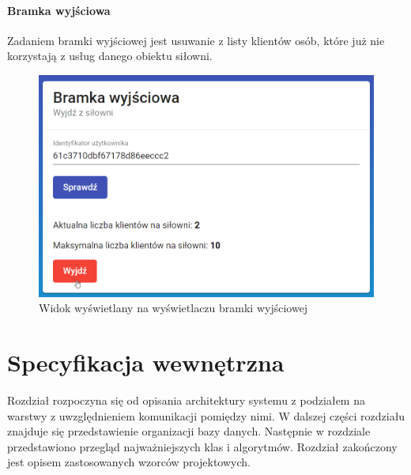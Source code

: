 \documentclass[a4paper,twoside,12pt]{book}
\begin{document}
{\subsubsection{Bramka wyjściowa}
Zadaniem bramki wyjściowej jest usuwanie z listy klientów osób, które już nie korzystają z usług danego obiektu siłowni.
\begin{figure}[h!]
	\centering
	\includegraphics[width=1\linewidth]{../zrzuty_ekranu/dzialanie/bramki/bramka_wyjsciowa}
	\caption{Widok wyświetlany na wyświetlaczu bramki wyjściowej}
	\label{fig:bramkawyjsciowa}
\end{figure}
\FloatBarrier

\chapter{Specyfikacja wewnętrzna}
\label{chap:internal}
Rozdział rozpoczyna się od opisania architektury systemu z podziałem na warstwy z uwzględnieniem komunikacji pomiędzy nimi. W dalszej części rozdziału znajduje się przedstawienie organizacji bazy danych. Następnie w rozdziale przedstawiono przegląd najważniejszych klas i algorytmów. Rozdział zakończony jest opisem zastosowanych wzorców projektowych.

}
\end{document}
